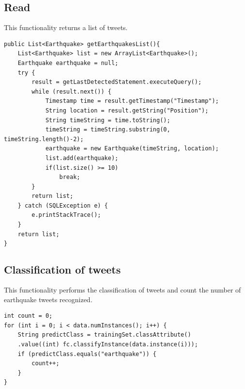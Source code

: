 \documentclass[a4paper, oneside]{article}
\begin{document}
\subsection{Read}
This functionality returns a list of tweets.
\vspace{2mm}
\begin{verbatim}
public List<Earthquake> getEarthquakesList(){
    List<Earthquake> list = new ArrayList<Earthquake>();
    Earthquake earthquake = null;	
    try {
        result = getLastDetectedStatement.executeQuery();
        while (result.next()) {
            Timestamp time = result.getTimestamp("Timestamp");
            String location = result.getString("Position");
            String timeString = time.toString();
            timeString = timeString.substring(0, timeString.length()-2);
            earthquake = new Earthquake(timeString, location);
            list.add(earthquake);
            if(list.size() >= 10)
                break;
        }
        return list;
    } catch (SQLException e) {
        e.printStackTrace();
    }
    return list;
}
\end{verbatim}
\vspace{5mm}

\subsection{Classification of tweets}
This functionality performs the classification of tweets and count the number of earthquake tweets recognized.
\vspace{2mm}
\begin{verbatim}
int count = 0;
for (int i = 0; i < data.numInstances(); i++) {
    String predictClass = trainingSet.classAttribute()
    .value((int) fc.classifyInstance(data.instance(i)));
    if (predictClass.equals("earthquake")) {
        count++;
    }
}
\end{verbatim}
\vspace{5mm}

\clearpage
\end{document}
